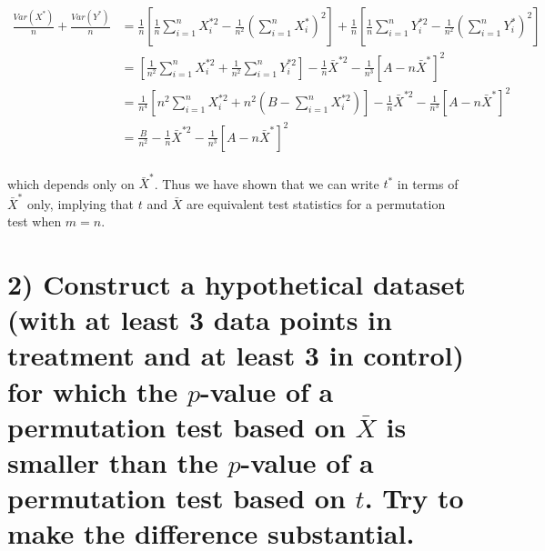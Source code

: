 \documentclass[11pt]{article}
\newcommand{\pr}{P} %
\begin{document}
\begin{align*}
\frac{Var(X^*)}{n} + \frac{Var(Y^*)}{n} &= \frac{1}{n} \left[ \frac1n \sum_{i=1}^n X_i^{*2} - \frac{1}{n^2} \left( \sum_{i=1}^n X_i^*\right)^2 \right] + \frac{1}{n} \left[ \frac1n \sum_{i=1}^n Y_i^{*2} - \frac{1}{n^2} \left( \sum_{i=1}^n Y_i^*\right)^2 \right]\\
& = \left[ \frac{1}{n^2} \sum_{i=1}^n X_i^{*2} + \frac{1}{n^2} \sum_{i=1}^n Y_i^{*2} \right] - \frac1n\bar{X}^{*2} - \frac{1}{n^3} \left[A - n \bar{X}^* \right]^2\\
& = \frac{1}{n^4}\left[ n^2 \sum_{i=1}^n X_i^{*2} + n^2\left(B - \sum_{i=1}^n X_i^{*2}\right) \right] - \frac1n\bar{X}^{*2} - \frac{1}{n^3} \left[A - n \bar{X}^* \right]^2\\
& = \frac{B}{n^2} - \frac1n\bar{X}^{*2} - \frac{1}{n^3} \left[A - n \bar{X}^* \right]^2\\
\end{align*}

\noindent which depends only on $\bar{X}^{*}$. Thus we have shown that we can write $t^*$ in terms of $\bar{X}^*$ only, implying that $t$ and $\bar{X}$ are equivalent test statistics for a permutation test when $m  = n$.


\section*{2) Construct a hypothetical dataset (with at least 3 data points in treatment and at least 3 in control) for which the $p$-value of a permutation test based on $\bar{X}$ is smaller than the $p$-value of a permutation test based on $t$. Try to make the difference substantial.}

%
%
%
%
\end{document}
